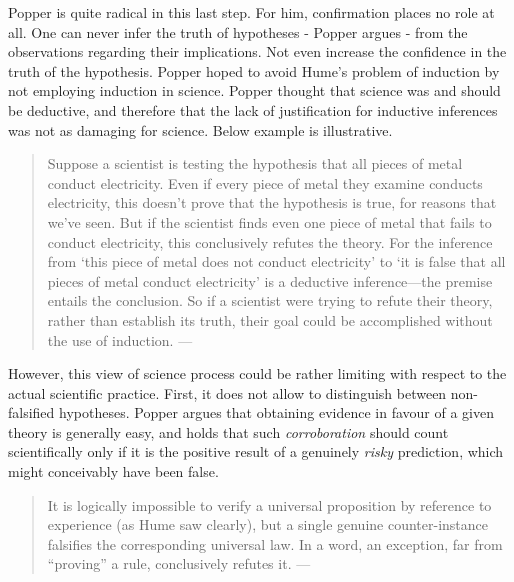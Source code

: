 \documentclass[
]{book}
\begin{document}
Popper is quite radical in this last step. For him, confirmation places no role at all. One can never infer the truth of hypotheses - Popper argues - from the observations regarding their implications. Not even increase the confidence in the truth of the hypothesis. Popper hoped to avoid Hume's problem of induction by not employing induction in science. Popper thought that science was and should be deductive, and therefore that the lack of justification for inductive inferences was not as damaging for science. Below example is illustrative.

\begin{quote}
Suppose a scientist is testing the hypothesis that all pieces of metal conduct electricity. Even if every piece of metal they examine conducts electricity, this doesn't prove that the hypothesis is true, for reasons that we've seen. But if the scientist finds even one piece of metal that fails to conduct electricity, this conclusively refutes the theory. For the inference from `this piece of metal does not conduct electricity' to `it is false that all pieces of metal conduct electricity' is a deductive inference---the premise entails the conclusion. So if a scientist were trying to refute their theory, rather than establish its truth, their goal could be accomplished without the use of induction. --- \citep{okasha-pos}
\end{quote}

However, this view of science process could be rather limiting with respect to the actual scientific practice. First, it does not allow to distinguish between non-falsified hypotheses. Popper argues that obtaining evidence in favour of a given theory is generally easy, and holds that such \emph{corroboration} should count scientifically only if it is the positive result of a genuinely \emph{risky} prediction, which might conceivably have been false.

\begin{quote}
It is logically impossible to verify a universal proposition by reference to experience (as Hume saw clearly), but a single genuine counter-instance falsifies the corresponding universal law. In a word, an exception, far from ``proving'' a rule, conclusively refutes it. --- \citep{sep-popper}
\end{quote}
\end{document}
